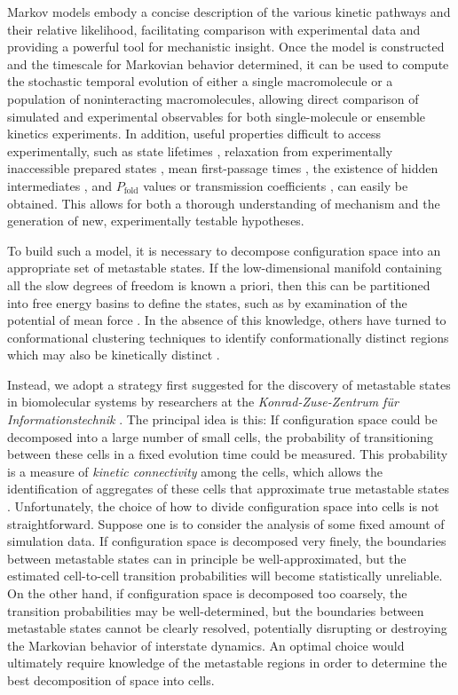 Markov models embody a concise description of the various kinetic pathways and their relative likelihood, facilitating comparison with experimental data and providing a powerful tool for mechanistic insight.
Once the model is constructed and the timescale for Markovian behavior determined, it can be used to compute the stochastic temporal evolution of either a single macromolecule or a population of noninteracting macromolecules, allowing direct comparison of simulated and experimental observables for both single-molecule or ensemble kinetics experiments.
In addition, useful properties difficult to access experimentally, such as state lifetimes \cite{swope:2004a}, relaxation from experimentally inaccessible prepared states \cite{chodera:mms:2006}, mean first-passage times \cite{singhal:2004a}, the existence of hidden intermediates \cite{ozkan:2002a}, and $P_\mathrm{fold}$ values or transmission coefficients \cite{lenz:2004a}, can easily be obtained.
This allows for both a thorough understanding of mechanism and the generation of new, experimentally testable hypotheses.

To build such a model, it is necessary to decompose configuration space into an appropriate set of metastable states.
If the low-dimensional manifold containing all the slow degrees of freedom is known a priori, then this can be partitioned into free energy basins to define the states, such as by examination of the potential of mean force \cite{swope:2004b,sriraman:2005a,sorin:2005b,elmer:2005b,chodera:mms:2006}.
In the absence of this knowledge, others have turned to conformational clustering techniques to identify conformationally distinct regions which may also be kinetically distinct \cite{karpen:1993a,degroot:2001a,singhal:2004a,levy:2005a}.

Instead, we adopt a strategy first suggested for the discovery of metastable states in biomolecular systems by researchers at the \emph{Konrad-Zuse-Zentrum f\"{u}r Informationstechnik} \cite{schuette:1999a}.
The principal idea is this: If configuration space could be decomposed into a large number of small cells, the probability of transitioning between these cells in a fixed evolution time could be measured.
This probability is a measure of \emph{kinetic connectivity} among the cells, which allows the identification of aggregates of these cells that approximate true metastable states \cite{schuette:2002b}.
Unfortunately, the choice of how to divide configuration space into cells is not straightforward.
Suppose one is to consider the analysis of some fixed amount of simulation data. 
If configuration space is decomposed very finely, the boundaries between metastable states can in principle be well-approximated, but the estimated cell-to-cell transition probabilities will become statistically unreliable.
On the other hand, if configuration space is decomposed too coarsely, the transition probabilities may be well-determined, but the boundaries between metastable states cannot be clearly resolved, potentially disrupting or destroying the Markovian behavior of interstate dynamics.
An optimal choice would ultimately require knowledge of the metastable regions in order to determine the best decomposition of space into cells.

